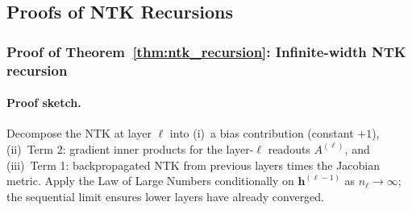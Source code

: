 \subsection{Proofs of NTK Recursions}\label{appendix:ntk-recursions}
\subsubsection{Proof of Theorem~\ref{thm:ntk_recursion}: Infinite-width NTK recursion}
\label{appendix:proof-ntk-recursion}

\paragraph{Proof sketch.} Decompose the NTK at layer \(\ell\) into (i)~a bias contribution (constant \(+1\)), (ii)~Term 2: gradient inner products for the layer-\(\ell\) readouts \(A^{(\ell)}\), and (iii)~Term 1: backpropagated NTK from previous layers times the Jacobian metric. Apply the Law of Large Numbers conditionally on \(\bm{h}^{(\ell-1)}\) as \(n_\ell\to\infty\); the sequential limit ensures lower layers have already converged.
